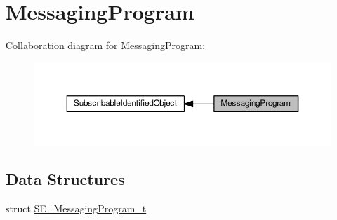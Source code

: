 \hypertarget{group__MessagingProgram}{}\section{Messaging\+Program}
\label{group__MessagingProgram}
Collaboration diagram for Messaging\+Program\+:\nopagebreak
\begin{figure}[H]
\begin{center}
\leavevmode
\includegraphics[width=350pt]{group__MessagingProgram}
\end{center}
\end{figure}
\subsection*{Data Structures}
\begin{DoxyCompactItemize}
\item 
struct \hyperlink{structSE__MessagingProgram__t}{S\+E\+\_\+\+Messaging\+Program\+\_\+t}
\end{DoxyCompactItemize}
